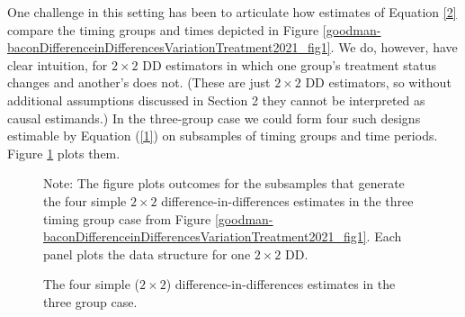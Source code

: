 \documentclass[12pt]{article}
\theoremstyle{definition}
\begin{document}
One challenge in this setting has been to articulate how estimates of Equation \ref{2} compare the timing groups and times depicted in Figure \ref{goodman-baconDifferenceinDifferencesVariationTreatment2021_fig1}. We do, however, have clear intuition, for $2\times 2$ DD estimators in which one group's treatment status changes and another's does not. (These are just $2 \times 2$ DD estimators, so without additional assumptions discussed in Section 2 they cannot be interpreted as causal estimands.) In the three-group case we could form four such designs estimable by Equation (\ref{1}) on subsamples of timing groups and time periods. Figure \ref{goodman-baconDifferenceinDifferencesVariationTreatment2021_fig2} plots them. 

\begin{figure}[H]
    \noindent\caption{The four simple ($2 \times 2$) difference-in-differences estimates in the three group case.}
    \begin{center}
    \end{center}
    \medskip
    {\footnotesize Note: The figure plots outcomes for the subsamples that generate the four simple $2 \times 2$ difference-in-differences estimates in the three timing group case from Figure \ref{goodman-baconDifferenceinDifferencesVariationTreatment2021_fig1}. Each panel plots the data structure for one $2\times 2$ DD. }
    \label{goodman-baconDifferenceinDifferencesVariationTreatment2021_fig2}
\end{figure}
\end{document}
